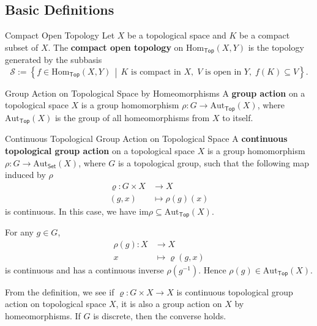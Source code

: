 \documentclass{report}
\newcommand{\midv}{\,\middle\vert\,}
\begin{document}
\subsection{Basic Definitions}
\begin{definition}{Compact Open Topology}{}
	Let $X$ be a topological space and $K$ be a compact subset of $X$. The \textbf{compact open topology} on $\mathrm{Hom}_{\mathsf{Top}}(X,Y)$ is the topology generated by the subbasis
	\[
		\mathcal{S}:=\left\{f\in \mathrm{Hom}_{\mathsf{Top}}(X,Y)\midv K\text{ is compact in }X,\;V\text{ is open in }Y,\;f(K)\subseteq V\right\}.
	\]
\end{definition}


\begin{definition}{Group Action on Topological Space by Homeomorphisms}{}
	A \textbf{group action} on a topological space $X$ is a group homomorphism $\rho:G\to \mathrm{Aut}_{\mathsf{Top}}(X)$, where $\mathrm{Aut}_{\mathsf{Top}}(X)$ is the group of all homeomorphisms from $X$ to itself.
\end{definition}


\begin{definition}{Continuous Topological Group Action on Topological Space}{}
	A \textbf{continuous topological group action} on a topological space $X$ is a group homomorphism $\rho:G\to \mathrm{Aut}_{\mathsf{Set}}(X)$, where $G$ is a topological group, such that the following map induced by $\rho$
	\begin{align*}
		\varrho:G\times X & \longrightarrow X      \\
		(g,x)             & \longmapsto \rho(g)(x)
	\end{align*}
	is continuous. In this case, we have $\mathrm{im}\rho \subseteq \mathrm{Aut}_{\mathsf{Top}}(X)$.
\end{definition}

\begin{prf}
	For any $g\in G$,
	\begin{align*}
		\rho(g): X & \longrightarrow X        \\
		x          & \longmapsto \varrho(g,x)
	\end{align*}
	is continuous and has a continuous inverse $\rho(g^{-1})$. Hence $\rho(g)\in \mathrm{Aut}_{\mathsf{Top}}(X)$.
\end{prf}

From the definition, we see if $\varrho:G\times X\to X$ is continuous topological group action on topological space $X$, it is also a group action on $X$ by homeomorphisms. If $G$ is discrete, then the converse holds.
\end{document}
